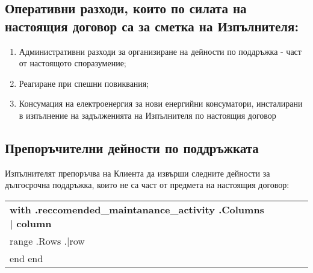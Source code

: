 \subsection{Оперативни разходи, които по силата на настоящия договор са за сметка на Изпълнителя:}
\begin{enumerate}
	\item Административни разходи за организиране на дейности по поддръжка {-} част от настоящото споразумение;
	\item Реагиране при спешни повиквания;
	\item Консумация на електроенергия за нови енергийни консуматори, инсталирани в изпълнение на задълженията на Изпълнителя по настоящия договор
\end{enumerate}

\subsection{Препоръчителни дейности по поддръжката}
Изпълнителят препоръчва на Клиента да извърши следните дейности за дългосрочна поддръжка, които не са част от предмета на настоящия договор:


\begin{center}
\begin{tabu}{|X[3]|X|X|X|X|} \tabucline{} \rowfont[c]\bfseries
{{with .reccomended_maintanance_activity}} %
	{{.Columns | column}} \\\tabucline{}
	{{range .Rows}} %
	{{.|row}} \\\tabucline{}
	{{end}}
        {{end}}
\end{tabu}
\end{center}
